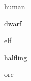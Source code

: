 \begin{multicols*}{2}
    {human}

    {dwarf}

    {elf}

    {halfling}

    {orc}
\end{multicols*}

